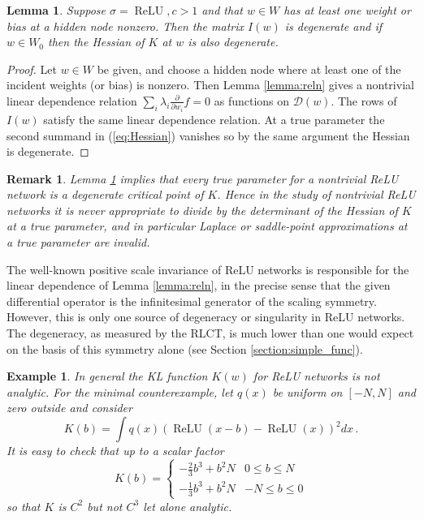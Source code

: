 \documentclass[11pt]{article}
\numberwithin{equation}{section}
\theoremstyle{plain}
\newtheorem{lemma}[theorem]{Lemma}
\newtheorem{example}[theorem]{Example}
\newtheorem{remark}[theorem]{Remark}
\theoremstyle{definition}
\begin{document}
\begin{lemma}\label{lemma:all_degen} Suppose $\sigma = \operatorname{ReLU}, c > 1$ and that $w \in W$ has at least one weight or bias at a hidden node nonzero. Then the matrix $I(w)$ is degenerate and if $w \in W_0$ then the Hessian of $K$ at $w$ is also degenerate.
\end{lemma}
\begin{proof}
	Let $w \in W$ be given, and choose a hidden node where at least one of the incident weights (or bias) is nonzero. Then Lemma \ref{lemma:reln} gives a nontrivial linear dependence relation $\sum_i \lambda_i \frac{\partial}{\partial w_i} f = 0$ as functions on $\mathcal{D}(w)$. The rows of $I(w)$ satisfy the same linear dependence relation. At a true parameter the second summand in (\ref{eq:Hessian}) vanishes so by the same argument the Hessian is degenerate.
\end{proof}

\begin{remark}\label{remark:byebye_laplace}
	Lemma \ref{lemma:all_degen} implies that every true parameter for a nontrivial ReLU network is a degenerate critical point of $K$. Hence in the study of nontrivial ReLU networks it is never appropriate to divide by the determinant of the Hessian of $K$ at a true parameter, and in particular Laplace or saddle-point approximations at a true parameter are invalid.
\end{remark}

The well-known positive scale invariance of ReLU networks \citep{phuong2020functional} is responsible for the linear dependence of Lemma \ref{lemma:reln}, in the precise sense that the given differential operator is the infinitesimal generator \citep[\S IV.3]{boothby1986introduction} of the scaling symmetry. However, this is only one source of degeneracy or singularity in ReLU networks. The degeneracy, as measured by the RLCT, is much lower than one would expect on the basis of this symmetry alone (see Section \ref{section:simple_func}).

\begin{example}\label{example:not_analytic} In general the KL function $K(w)$ for ReLU networks is not analytic. For the minimal counterexample, let $q(x)$ be uniform on $[-N, N]$ and zero outside and consider
	\[
	K(b) = \int q(x) ( \operatorname{ReLU}(x - b) - \operatorname{ReLU}(x) )^2 dx\,.
	\]
	It is easy to check that up to a scalar factor
	\[
	K(b) = \begin{cases} -\tfrac{2}{3} b^3 + b^2 N & 0 \le b \le N \\
	-\tfrac{1}{3} b^3 + b^2 N & -N \le b \le 0
	\end{cases}
	\]
	so that $K$ is $C^2$ but not $C^3$ let alone analytic.
\end{example}
\end{document}

